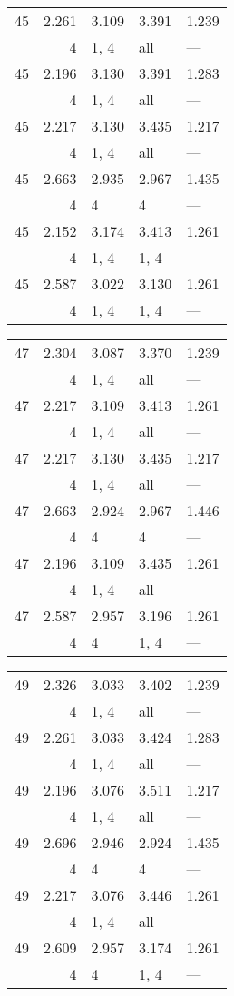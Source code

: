\begin{tabular}{lrlll}
\toprule
 45 & 2.261 & 3.109 & 3.391 & 1.239 \\
    & 4     & 1, 4  & all   & ---   \\
 45 & 2.196 & 3.130 & 3.391 & 1.283 \\
    & 4     & 1, 4  & all   & ---   \\
 45 & 2.217 & 3.130 & 3.435 & 1.217 \\
    & 4     & 1, 4  & all   & ---   \\
 45 & 2.663 & 2.935 & 2.967 & 1.435 \\
    & 4     & 4     & 4     & ---   \\
 45 & 2.152 & 3.174 & 3.413 & 1.261 \\
    & 4     & 1, 4  & 1, 4  & ---   \\
 45 & 2.587 & 3.022 & 3.130 & 1.261 \\
    & 4     & 1, 4  & 1, 4  & ---   \\
\bottomrule
\end{tabular}
\begin{tabular}{lrlll}
\toprule
 47 & 2.304 & 3.087 & 3.370 & 1.239 \\
    & 4     & 1, 4  & all   & ---   \\
 47 & 2.217 & 3.109 & 3.413 & 1.261 \\
    & 4     & 1, 4  & all   & ---   \\
 47 & 2.217 & 3.130 & 3.435 & 1.217 \\
    & 4     & 1, 4  & all   & ---   \\
 47 & 2.663 & 2.924 & 2.967 & 1.446 \\
    & 4     & 4     & 4     & ---   \\
 47 & 2.196 & 3.109 & 3.435 & 1.261 \\
    & 4     & 1, 4  & all   & ---   \\
 47 & 2.587 & 2.957 & 3.196 & 1.261 \\
    & 4     & 4     & 1, 4  & ---   \\
\bottomrule
\end{tabular}
\begin{tabular}{lrlll}
\toprule
 49 & 2.326 & 3.033 & 3.402 & 1.239 \\
    & 4     & 1, 4  & all   & ---   \\
 49 & 2.261 & 3.033 & 3.424 & 1.283 \\
    & 4     & 1, 4  & all   & ---   \\
 49 & 2.196 & 3.076 & 3.511 & 1.217 \\
    & 4     & 1, 4  & all   & ---   \\
 49 & 2.696 & 2.946 & 2.924 & 1.435 \\
    & 4     & 4     & 4     & ---   \\
 49 & 2.217 & 3.076 & 3.446 & 1.261 \\
    & 4     & 1, 4  & all   & ---   \\
 49 & 2.609 & 2.957 & 3.174 & 1.261 \\
    & 4     & 4     & 1, 4  & ---   \\
\bottomrule
\end{tabular}
